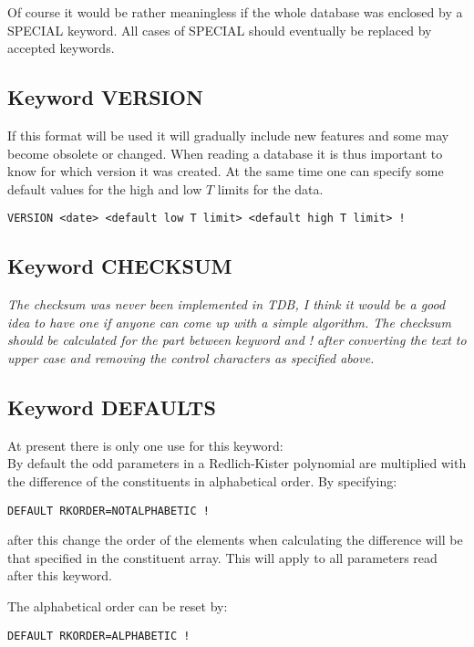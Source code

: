 \documentclass[12pt]{article}
\begin{document}
Of course it would be rather meaningless if the whole database was
enclosed by a SPECIAL keyword.  All cases of SPECIAL should eventually
be replaced by accepted keywords.

\subsection{Keyword VERSION}

If this format will be used it will gradually include new features and
some may become obsolete or changed.  When reading a database it is
thus important to know for which version it was created.  At the same
time one can specify some default values for the high and low $T$
limits for the data.

\begin{verbatim}
VERSION <date> <default low T limit> <default high T limit> !
\end{verbatim}

\subsection{Keyword CHECKSUM}

{\em The checksum was never been implemented in TDB, I think it would
  be a good idea to have one if anyone can come up with a simple
  algorithm.  The checksum should be calculated for the part between
  keyword and ! after converting the text to upper case and removing
  the control characters as specified above.}

\subsection{Keyword DEFAULTS}\label{sec:defaults}

At present there is only one use for this keyword:\\

By default the odd parameters in a Redlich-Kister polynomial are
multiplied with the difference of the constituents in alphabetical order.
By specifying:
\begin{verbatim}
DEFAULT RKORDER=NOTALPHABETIC !
\end{verbatim}
after this change the order of the elements when calculating the
difference will be that specified in the constituent array.  This will
apply to all parameters read after this keyword.

The alphabetical order can be reset by:
\begin{verbatim}
DEFAULT RKORDER=ALPHABETIC !
\end{verbatim}
\end{document}
